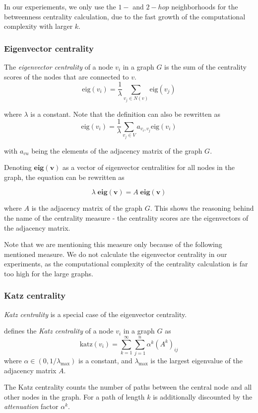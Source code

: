 In our experiements, we only use the $1-$ and $2-hop$ neighborhoods for the betweenness centrality calculation, due to the fast growth of the computational complexity with larger $k$.

\subsubsection{Eigenvector centrality}
The \textit{eigenvector centrality} of a node $v_i$ in a graph $G$ is the sum of the centrality scores of the nodes that are connected to $v$.
$$
\text{eig}(v_i) = \frac{1}{\lambda} \sum_{v_j \in N(v)} \text{eig}(v_j)
$$

where $\lambda$ is a constant. Note that the definition can also be rewritten as 
$$
\text{eig}(v_i) = \frac{1}{\lambda} \sum_{v_j \in V} a_{v_i, v_j} \text{eig}(v_i)
$$

with $a_{vu}$ being the elements of the adjacency matrix of the graph $G$.

Denoting $\mathbf{eig(v)}$ as a vector of eigenvector centralities for all nodes in the graph, the equation can be rewritten as

$$
\lambda \; \mathbf{eig(v)} = A \; \mathbf{eig(v)}
$$

where $A$ is the adjacency matrix of the graph $G$. 
This shows the reasoning behind the name of the centrality measure - the centrality scores are the eigenvectors of the adjacency matrix.

Note that we are mentioning this measure only because of the following mentioned measure.
We do not calculate the eigenvector centrality in our experiments, as the computational complexity of the centrality calculation is far too high for the large graphs.

\subsubsection{Katz centrality}\label{def:katz-centrality}
\textit{Katz centrality} is a special case of the eigenvector centrality.

\cite{Katz1953} defines the \textit{Katz centrality} of a node $v_i$ in a graph $G$ as
$$
\text{katz}(v_i) = \sum_{k=1}^{\infty} \sum_{j=1}^n \alpha^k (A^k)_{ij}
$$
where $\alpha \in (0, 1/\lambda_{\text{max}})$ is a constant, and $\lambda_{\text{max}}$ is the largest eigenvalue of the adjacency matrix $A$.

The Katz centrality counts the number of paths between the central node and all other nodes in the graph.
For a path of length $k$ is additionally discounted by the \textit{attenuation} factor $\alpha^k$.

